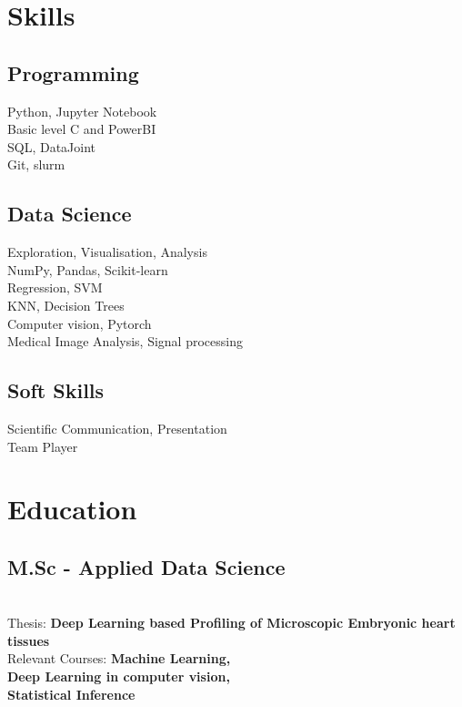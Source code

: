 \documentclass[letterpaper]{deedy-resume} %
\begin{document}
\begin{minipage}[t]{0.33\textwidth} %


\section{Skills}

\subsection{Programming}
\faPython \hspace{1pt} Python, Jupyter Notebook \\
Basic level C and PowerBI\\
\faDatabase \hspace{1pt} SQL, DataJoint \\
Git, slurm 

\sectionspace %
\subsection{Data Science}
Exploration, Visualisation, Analysis\\
NumPy, Pandas, Scikit-learn \\
Regression, SVM \\
KNN, Decision Trees \\
Computer vision, Pytorch\\
Medical Image Analysis, Signal processing

\sectionspace %
\subsection{Soft Skills}
Scientific Communication, Presentation\\
Team Player


\sectionspace
\section{Education} 

\subsection{M.Sc - Applied Data Science}
\hfill {} 
\\Thesis: %
{\bf Deep Learning based Profiling of Microscopic Embryonic heart tissues}
\vspace{0.5\topsep}
\\Relevant Courses: {\bf Machine Learning,\\
Deep Learning in computer vision,\\ 
Statistical Inference}


\end{minipage}
\end{document}
